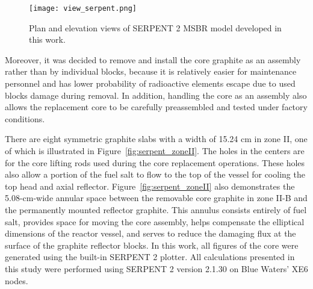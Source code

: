 \begin{figure}[hbp!] %
  \centering
  \texttt{[image: view\_serpent.png]}
  \caption{Plan and elevation views of SERPENT 2 \gls{MSBR} model developed in 
this work.}
  \label{fig:serpent_plan_view}
\end{figure}

Moreover, it was decided to remove and install the core graphite as an assembly 
rather than by individual blocks, because it is relatively easier for 
maintenance personnel and has lower probability of radioactive elements escape 
due to used blocks damage during removal. In addition, handling the core as an 
assembly also allows the replacement core to be carefully preassembled and 
tested under factory conditions.

There are eight symmetric graphite slabs with a width of 15.24 cm in zone II, 
one of which is illustrated in Figure~\ref{fig:serpent_zoneII}. The holes in the 
centers are for the core lifting rods used during the core replacement 
operations. These holes also allow a portion of the fuel salt to flow to the top 
of the vessel for cooling the top head and axial reflector. 
Figure~\ref{fig:serpent_zoneII} also demonstrates the 5.08-cm-wide annular space 
between the removable core graphite in zone II-B and the permanently mounted 
reflector graphite. This annulus consists entirely of fuel salt, provides space 
for moving the core assembly, helps compensate the elliptical dimensions of the 
reactor vessel, and serves to reduce the damaging flux at the surface of the 
graphite reflector blocks. In this work, all figures of the core were generated 
using the built-in SERPENT 2 plotter. All calculations presented in this study 
were performed using SERPENT 2 version 2.1.30 on Blue Waters’ XE6 nodes. 

